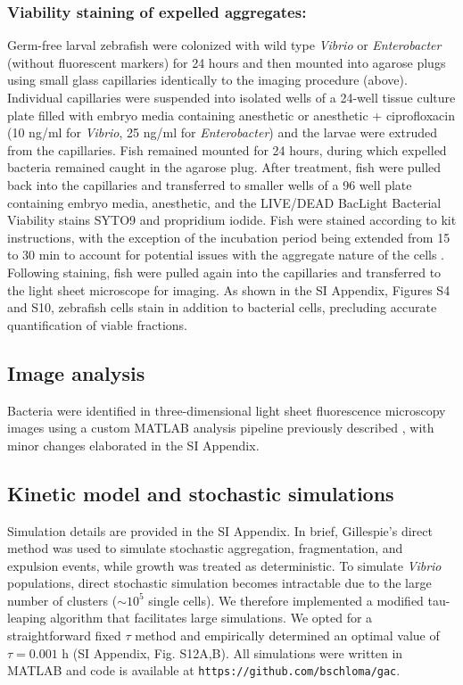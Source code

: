  \subsubsection{Viability staining of expelled aggregates:}  Germ-free larval zebrafish were colonized with wild type \textit{Vibrio} or \textit{Enterobacter} (without fluorescent markers) for 24 hours and then mounted into agarose plugs using small glass capillaries identically to the imaging procedure (above). Individual capillaries were suspended into isolated wells of a 24-well tissue culture plate filled with embryo media containing anesthetic or anesthetic + ciprofloxacin (10 ng/ml for \textit{Vibrio}, 25 ng/ml for \textit{Enterobacter}) and the larvae were extruded from the capillaries. Fish remained mounted for 24 hours, during which expelled bacteria remained caught in the agarose plug. After treatment, fish were pulled back into the capillaries and transferred to smaller wells of a 96 well plate containing embryo media, anesthetic, and the LIVE/DEAD BacLight Bacterial Viability stains SYTO9 and propridium iodide. Fish were stained according to kit instructions, with the exception of the incubation period being extended from 15 to 30 min to account for potential issues with the aggregate nature of the cells \cite{netuschil2014confusion}.  Following staining, fish were pulled again into the capillaries and transferred to the light sheet microscope for imaging. As shown in the SI Appendix, Figures S4 and S10, zebrafish cells stain in addition to bacterial cells, precluding accurate quantification of viable fractions.

 \subsection{Image analysis}

Bacteria were identified in three-dimensional light sheet fluorescence microscopy images using a custom MATLAB analysis pipeline previously described \cite{jemielita_spatial_2014,schlomann_bacterial_2018}, with minor changes elaborated in the SI Appendix.


 \subsection{Kinetic model and stochastic simulations}
Simulation details are provided in the SI Appendix. In brief, Gillespie's direct method \cite{gillespie1977exact} was used to simulate stochastic aggregation, fragmentation, and expulsion events, while growth was treated as deterministic. To simulate \textit{Vibrio} populations, direct stochastic simulation becomes intractable due to the large number of clusters ($\sim 10^5$ single cells). We therefore implemented a modified tau-leaping algorithm \cite{gillespie2001approximate} that facilitates large simulations. We opted for a straightforward fixed $\tau$ method and empirically determined an optimal value of $\tau = 0.001$ h (SI Appendix, Fig. S12A,B). All simulations were written in MATLAB and code is available at \texttt{https://github.com/bschloma/gac}.






